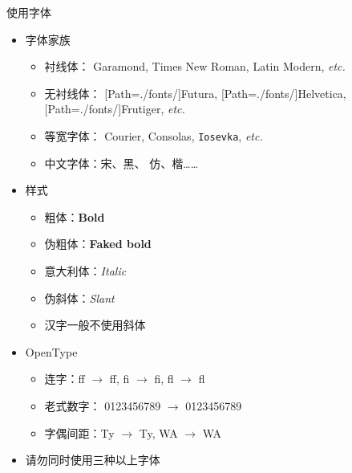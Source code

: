 \begin{frame}{使用字体}
\begin{itemize}
  \item 字体家族
    \begin{itemize}
      \item 衬线体：
        {Garamond},
        {Times New Roman},
        {Latin Modern}, \emph{etc.}
      \item 无衬线体：
        {[Path=./fonts/]Futura},
        {[Path=./fonts/]Helvetica},
        {[Path=./fonts/]Frutiger}, \emph{etc.}
      \item 等宽字体：
        {Courier},
        {Consolas},
        \texttt{Iosevka}, \emph{etc.}
      \item 中文字体：宋、{黑}、
        {仿}、{楷}……
    \end{itemize}
  \item 样式
    \begin{itemize}
      \item 粗体：\textbf{Bold}
      \item 伪粗体：{\textbf{Faked bold}}
      \item 意大利体：\textit{Italic}
      \item 伪斜体：{\textsl{Slant}}
      \item \alert{汉字一般不使用斜体}
    \end{itemize}
  \item OpenType
    \begin{itemize}
      \item 连字：{f}{f} $\to$ ff, {f}{i} $\to$ fi, {f}{l} $\to$ fl
      \item 老式数字：
        0123456789 $\to$ {0123456789}
      \item 字偶间距：{T}{y} $\to$ Ty, {W}{A} $\to$ WA
    \end{itemize}
  \item \alert{请勿同时使用三种以上字体}
\end{itemize}
\vspace{-0.2cm}
\end{frame}
